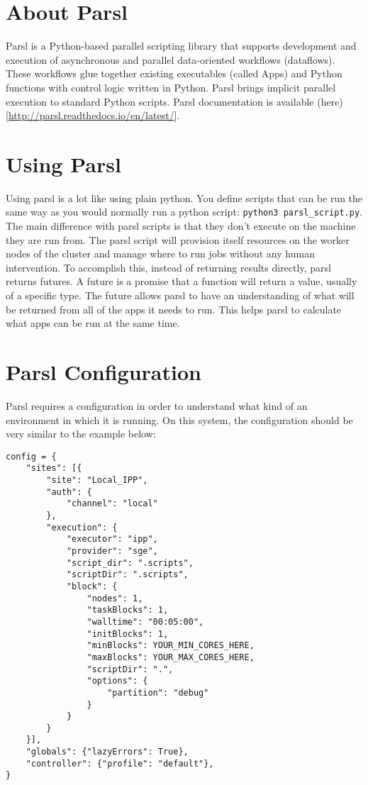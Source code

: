 \documentclass[]{book}
\theoremstyle{definition}
\theoremstyle{definition}
\theoremstyle{definition}
\theoremstyle{remark}
\begin{document}
\section{About Parsl}\label{about-parsl}

Parsl is a Python-based parallel scripting library that supports
development and execution of asynchronous and parallel data-oriented
workflows (dataflows). These workflows glue together existing
executables (called Apps) and Python functions with control logic
written in Python. Parsl brings implicit parallel execution to standard
Python scripts. Parsl documentation is available
(here){[}\url{http://parsl.readthedocs.io/en/latest/}{]}.

\section{Using Parsl}\label{using-parsl}

Using parsl is a lot like using plain python. You define scripts that
can be run the same way as you would normally run a python script:
\texttt{python3\ parsl\_script.py}. The main difference with parsl
scripts is that they don't execute on the machine they are run from. The
parsl script will provision itself resources on the worker nodes of the
cluster and manage where to run jobs without any human intervention. To
accomplish this, instead of returning results directly, parsl returns
futures. A future is a promise that a function will return a value,
usually of a specific type. The future allows parsl to have an
understanding of what will be returned from all of the apps it needs to
run. This helps parsl to calculate what apps can be run at the same
time.

\section{Parsl Configuration}\label{parsl-configuration}

Parsl requires a configuration in order to understand what kind of an
environment in which it is running. On this system, the configuration
should be very similar to the example below:

\begin{verbatim}
config = {
    "sites": [{
        "site": "Local_IPP",
        "auth": {
            "channel": "local"
        },
        "execution": {
            "executor": "ipp",
            "provider": "sge",
            "script_dir": ".scripts",
            "scriptDir": ".scripts",
            "block": {
                "nodes": 1,
                "taskBlocks": 1,
                "walltime": "00:05:00",
                "initBlocks": 1,
                "minBlocks": YOUR_MIN_CORES_HERE,
                "maxBlocks": YOUR_MAX_CORES_HERE,
                "scriptDir": ".",
                "options": {
                    "partition": "debug"
                }
            }
        }
    }],
    "globals": {"lazyErrors": True},
    "controller": {"profile": "default"},
}
\end{verbatim}
\end{document}
